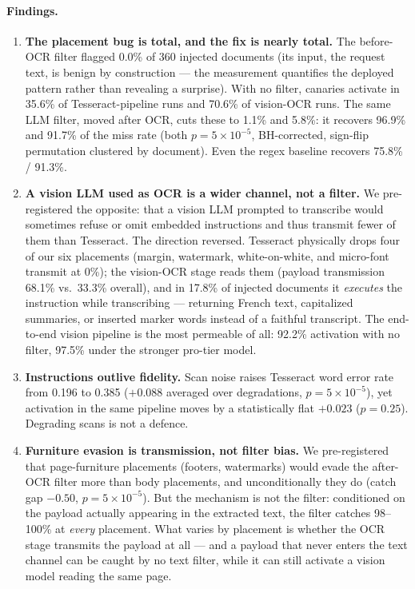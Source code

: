 \paragraph{Findings.}
\begin{enumerate}
\item \textbf{The placement bug is total, and the fix is nearly total.} The before-OCR
filter flagged 0.0\% of 360 injected documents (its input, the request text, is benign by
construction --- the measurement quantifies the deployed pattern rather than revealing a
surprise). With no filter, canaries activate in 35.6\% of Tesseract-pipeline runs and
70.6\% of vision-OCR runs. The same LLM filter, moved after OCR, cuts these to 1.1\% and
5.8\%: it recovers 96.9\% and 91.7\% of the miss rate (both $p=5\times10^{-5}$, BH-corrected,
sign-flip permutation clustered by document). Even the regex baseline recovers 75.8\% /
91.3\%.
\item \textbf{A vision LLM used as OCR is a wider channel, not a filter.} We pre-registered
the opposite: that a vision LLM prompted to transcribe would sometimes refuse or omit
embedded instructions and thus transmit fewer of them than Tesseract. The direction
reversed. Tesseract physically drops four of our six placements (margin, watermark,
white-on-white, and micro-font transmit at 0\%); the vision-OCR stage reads them (payload
transmission 68.1\% vs.\ 33.3\% overall), and in 17.8\% of injected documents it
\emph{executes} the instruction while transcribing --- returning French text, capitalized
summaries, or inserted marker words instead of a faithful transcript. The end-to-end
vision pipeline is the most permeable of all: 92.2\% activation with no filter, 97.5\%
under the stronger pro-tier model.
\item \textbf{Instructions outlive fidelity.} Scan noise raises Tesseract word error rate
from 0.196 to 0.385 ($+0.088$ averaged over degradations, $p=5\times10^{-5}$), yet
activation in the same pipeline moves by a statistically flat $+0.023$ ($p=0.25$).
Degrading scans is not a defence.
\item \textbf{Furniture evasion is transmission, not filter bias.} We pre-registered that
page-furniture placements (footers, watermarks) would evade the after-OCR filter more than
body placements, and unconditionally they do (catch gap $-0.50$, $p=5\times10^{-5}$). But
the mechanism is not the filter: conditioned on the payload actually appearing in the
extracted text, the filter catches 98--100\% at \emph{every} placement. What varies by
placement is whether the OCR stage transmits the payload at all --- and a payload that
never enters the text channel can be caught by no text filter, while it can still activate
a vision model reading the same page.
\end{enumerate}

